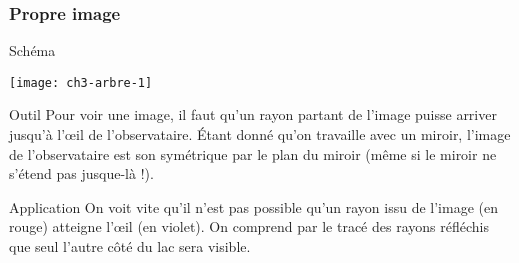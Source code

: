 \documentclass[../main/main.tex]{subfiles}
\begin{document}
\subsubsection{Propre image}
\begin{tcbraster}[raster columns=2, raster equal height=rows]
    \begin{NCdefi}{Schéma}
        \begin{center}
            \texttt{[image: ch3-arbre-1]}
        \end{center}
    \end{NCdefi}
    \begin{tcolorbox}[blankest, raster multicolumn=1, space to=\myspace]
        \begin{tcbraster}[raster columns=1]
            \begin{NCrapp}{Outil}
                Pour voir une image, il faut qu'un rayon partant de l'image
                puisse arriver jusqu'à l'œil de l'observataire. Étant donné
                qu'on travaille avec un miroir, l'image de l'observataire est
                son symétrique par le plan du miroir (même si le miroir ne
                s'étend pas jusque-là !).
            \end{NCrapp}
            \begin{NCexem}{Application}
                On voit vite qu'il n'est pas possible qu'un rayon issu de
                l'image (en rouge) atteigne l'œil (en violet). On comprend par
                le tracé des rayons réfléchis que seul l'autre côté du lac sera
                visible.
            \end{NCexem}
        \end{tcbraster}
    \end{tcolorbox}
\end{tcbraster}
\end{document}
